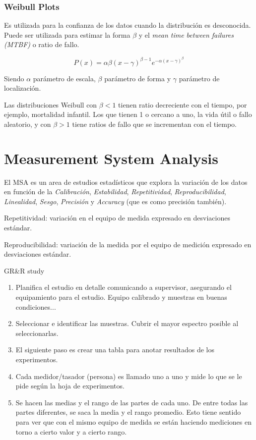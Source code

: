 \documentclass[]{article}
\begin{document}
\subsubsection{Weibull Plots}

Es utilizada para la confianza de los datos cuando la distribución es desconocida. Puede ser utilizada para estimar la forma $\beta$ y el \textit{mean time between failures (MTBF)} o ratio de fallo.

\begin{equation}
P(x) = \alpha \beta (x-\gamma)^{\beta - 1}e^{-\alpha(x-\gamma)^\beta}
\end{equation}

Siendo $\alpha$ parámetro de escala, $\beta$ parámetro de forma y $\gamma$ parámetro de localización.

Las distribuciones Weibull con $\beta < 1$ tienen ratio decreciente con el tiempo, por ejemplo, mortalidad infantil. Los que tienen 1 o cercano a uno, la vida útil o fallo aleatorio, y con $\beta > 1$ tiene ratios de fallo que se incrementan con el tiempo.

\section{Measurement System Analysis}

El MSA es un area de estudios estadísticos que explora la variación de los datos en función de la \textit{Calibración}, \textit{Estabilidad}, \textit{Repetitividad}, \textit{Reproducibilidad}, \textit{Linealidad}, \textit{Sesgo}, \textit{Precisión} y \textit{Accuracy} (que es como precisión también).

Repetitividad: variación en el equipo de medida expresado en desviaciones estándar. 


Reproducibilidad: variación de la medida por el equipo de medición expresado en desviaciones estándar. 

GR\&R study
\begin{enumerate}
	\item Planifica el estudio en detalle comunicando a supervisor, asegurando el equipamiento para el estudio. Equipo calibrado y muestras en buenas condiciones... 
	\item Seleccionar e identificar las muestras. Cubrir el mayor espectro posible al seleccionarlas. 
	\item El siguiente paso es crear una tabla para anotar resultados de los experimentos.
	\item Cada medidor/tasador (persona) es llamado uno a uno y mide lo que se le pide según la hoja de experimentos.
	\item Se hacen las medias y el rango de las partes de cada uno. De entre todas las partes diferentes, se saca la media y el rango promedio. Esto tiene sentido para ver que con el mismo equipo de medida se están haciendo mediciones en torno a cierto valor y a cierto rango.
\end{enumerate}
\end{document}
